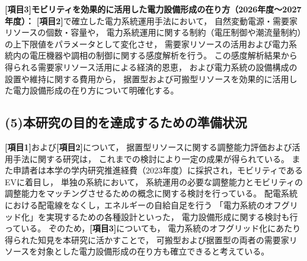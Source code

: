 \documentclass[11pt,a4paper,uplatex,dvipdfmx]{ujarticle} 		%
\newcommand{\研究課題名}{モビリティの時空間調整を活用した電力設備形成構築}
\newcommand{\研究機関名}{名古屋工業大学}
\newcommand{\研究代表者氏名}{中村勇太}
\newcommand{\研究期間の最終元号年度}{10}  %
\begin{document}
\vspace{0.5\baselineskip}           %

\textbf{[項目3]モビリティを効果的に活用した電力設備形成の在り方（2026年度～2027年度）：} 
\textbf{[項目2]}で確立した電力系統運用手法において，
自然変動電源・需要家リソースの個数・容量や，
電力系統運用に関する制約（電圧制御や潮流量制約）の上下限値をパラメータとして変化させ，
需要家リソースの活用および電力系統内の電圧機器や調相の制御に関する感度解析を行う。
この感度解析結果から得られる需要家リソース活用による経済的恩恵，
および電力系統の設備構成の設置や維持に関する費用から，
据置型および可搬型リソースを効果的に活用した電力設備形成の在り方について明確化する。




\vspace{-1\baselineskip}           %
\subsection*{(5)本研究の目的を達成するための準備状況}
\vspace{-0.5\baselineskip}           %

\textbf{[項目1]}および\textbf{[項目2]}について，
据置型リソースに関する調整能力評価および活用手法に関する研究は，
これまでの検討により一定の成果が得られている。%
また申請者は本学の学内研究推進経費（2023年度）に採択され，モビリティであるEVに着目し，
単独の系統において，
系統運用の必要な調整能力とモビリティの調整能力をマッチングさせるための概念に関する検討を行っている。
配電系統における配電線をなくし，エネルギーの自給自足を行う
「電力系統のオフグリッド化」を実現するための各種設計といった，
電力設備形成に関する検討も行っている。
ぞのため，\textbf{[項目3]}についても，%
電力系統のオフグリッド化にあたり得られた知見を本研究に活かすことで，
可搬型および据置型の両者の需要家リソースを対象とした電力設備形成の在り方も確立できると考えている。
\end{document}
